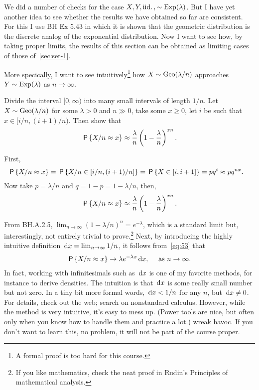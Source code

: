 \documentclass[a4paper,12pt]{article}
\begin{document}
We did a number of checks for the case $X, Y, \iid, \sim\Exp{\lambda}$.
But I have yet another idea to see whether the results we have obtained so far are consistent.
For this I use BH Ex 5.43 in which it is shown that the geometric distribution is the discrete analog of the exponential distribution. Now I want to see how, by taking proper limits, the results of this section can be obtained as limiting cases of those of~\cref{sec:set-1}. 

More specically, I want to see intuitively\footnote{A formal proof is too hard for this course.} how $X\sim \Geo{\lambda/n}$ approaches  $Y\sim\Exp{\lambda}$ as $n\to\infty$.

\begin{exercise}\label{ex:7} 
Divide the interval $[0, \infty)$ into many small intervals of length $1/n$.
Let  $X\sim \Geo{\lambda/n}$ for some $\lambda>0$ and $n\gg 0$, take  some $x\geq 0$,  let $i$ be such that $x\in[i/n, (i+1)/n)$.
Then show that 
\begin{align}\label{eq:53}
\P{X/n \approx x} \approx \frac{\lambda} n \left(1-\frac \lambda n\right)^{xn}.
\end{align}
\begin{solution}
First, 
\begin{align}
\P{X/n \approx x} &= \P{X/n \in [i/n, (i+1)/n]} = \P{X \in [i, i+1]} = p q^{i} \approx p q^{n x}.
\end{align}
Now take $p=\lambda/n$ and $q=1-p=1-\lambda/n$, then,
\begin{equation}
\P{X/n \approx x} \approx \frac{\lambda} n \left(1-\frac \lambda n\right)^{xn}.
\end{equation}
\end{solution}
\end{exercise}
From BH.A.2.5, $\lim_{n\to\infty}(1-\lambda/n)^{n} = e^{-\lambda}$, which is a standard limit but, interestingly, not entirely trivial to prove.\footnote{If you like mathematics, check the neat proof in Rudin's Principles of mathematical analysis.}
Next, by introducing the highly intuitive definition $\d x = \lim_{n\to \infty} 1/n$, it follows from~\cref{eq:53} that 
\begin{align}
\P{X/n \approx x} \to \lambda e^{-\lambda x} \d x,\quad\text{ as } n \to \infty.
\end{align}
In fact, working with infinitesimals such as $\d x$ is one of my favorite methods, for instance to derive densities.
The intuition is that $\d x$ is some really small number but not zero.
In a tiny bit more formal words, $\d x < 1/n$ for any $n$, but $\d x \neq 0$.
For details, check out the web; search on nonstandard calculus.
However, while the method is very intuitive, it's easy to mess up. (Power tools are nice, but often only when you know how to handle them and practice a lot.) wreak havoc.
If you don't want to learn this, no problem, it will not be part of the course proper.
\end{document}
